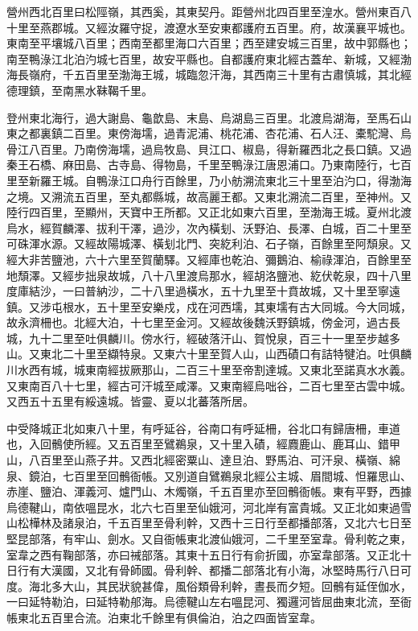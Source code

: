 \begin{pinyinscope}
 營州西北百里曰松陘嶺，其西奚，其東契丹。距營州北四百里至湟水。營州東百八十里至燕郡城。又經汝羅守捉，渡遼水至安東都護府五百里。府，故漢襄平城也。東南至平壤城八百里；西南至都里海口六百里；西至建安城三百里，故中郭縣也；南至鴨淥江北泊汋城七百里，故安平縣也。自都護府東北經古蓋牟、新城，又經渤海長嶺府，千五百里至渤海王城，城臨忽汗海，其西南三十里有古肅慎城，其北經德理鎮，至南黑水靺鞨千里。



 登州東北海行，過大謝島、龜歆島、末島、烏湖島三百里。北渡烏湖海，至馬石山東之都裏鎮二百里。東傍海壖，過青泥浦、桃花浦、杏花浦、石人汪、橐駝灣、烏骨江八百里。乃南傍海壖，過烏牧島、貝江口、椒島，得新羅西北之長口鎮。又過秦王石橋、麻田島、古寺島、得物島，千里至鴨淥江唐恩浦口。乃東南陸行，七百里至新羅王城。自鴨淥江口舟行百餘里，乃小舫溯流東北三十里至泊汋口，得渤海之境。又溯流五百里，至丸都縣城，故高麗王都。又東北溯流二百里，至神州。又陸行四百里，至顯州，天寶中王所都。又正北如東六百里，至渤海王城。夏州北渡烏水，經賀麟澤、拔利干澤，過沙，次內橫刬、沃野泊、長澤、白城，百二十里至可硃渾水源。又經故陽城澤、橫刬北門、突紇利泊、石子嶺，百餘里至阿頹泉。又經大非苦鹽池，六十六里至賀蘭驛。又經庫也乾泊、彌鵝泊、榆祿渾泊，百餘里至地頹澤。又經步拙泉故城，八十八里渡烏那水，經胡洛鹽池、紇伏乾泉，四十八里度庫結沙，一曰普納沙，二十八里過橫水，五十九里至十賁故城，又十里至寧遠鎮。又涉屯根水，五十里至安樂戍，戍在河西壖，其東壖有古大同城。今大同城，故永濟柵也。北經大泊，十七里至金河。又經故後魏沃野鎮城，傍金河，過古長城，九十二里至吐俱麟川。傍水行，經破落汗山、賀悅泉，百三十一里至步越多山。又東北二十里至纈特泉。又東六十里至賀人山，山西磧口有詰特犍泊。吐俱麟川水西有城，城東南經拔厥那山，二百三十里至帝割達城。又東北至諾真水水義。又東南百八十七里，經古可汗城至咸澤。又東南經烏咄谷，二百七里至古雲中城。又西五十五里有綏遠城。皆靈、夏以北蕃落所居。



 中受降城正北如東八十里，有呼延谷，谷南口有呼延柵，谷北口有歸唐柵，車道也，入回鶻使所經。又五百里至鷿鵜泉，又十里入磧，經麚鹿山、鹿耳山、錯甲山，八百里至山燕子井。又西北經密粟山、達旦泊、野馬泊、可汗泉、橫嶺、綿泉、鏡泊，七百里至回鶻衙帳。又別道自鷿鵜泉北經公主城、眉間城、怛羅思山、赤崖、鹽泊、渾義河、爐門山、木燭嶺，千五百里亦至回鶻衙帳。東有平野，西據烏德鞬山，南依嗢昆水，北六七百里至仙娥河，河北岸有富貴城。又正北如東過雪山松樺林及諸泉泊，千五百里至骨利幹，又西十三日行至都播部落，又北六七日至堅昆部落，有牢山、劍水。又自衙帳東北渡仙娥河，二千里至室韋。骨利乾之東，室韋之西有鞠部落，亦曰祴部落。其東十五日行有俞折國，亦室韋部落。又正北十日行有大漢國，又北有骨師國。骨利幹、都播二部落北有小海，冰堅時馬行八日可度。海北多大山，其民狀貌甚偉，風俗類骨利幹，晝長而夕短。回鶻有延侄伽水，一曰延特勒泊，曰延特勒郍海。烏德鞬山左右嗢昆河、獨邏河皆屈曲東北流，至衙帳東北五百里合流。泊東北千餘里有俱倫泊，泊之四面皆室韋。




\end{pinyinscope}
